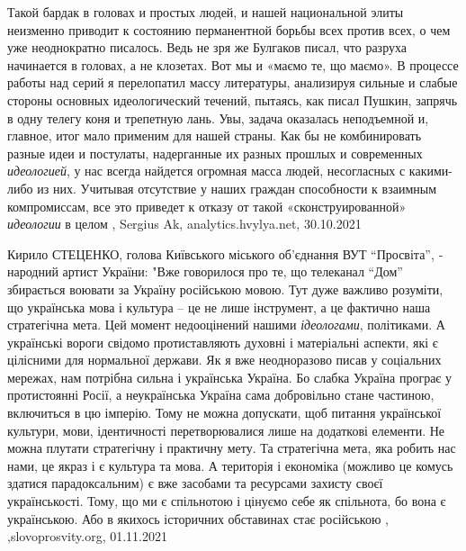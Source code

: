 Такой бардак в головах и простых людей, и нашей национальной элиты неизменно
приводит к состоянию перманентной борьбы всех против всех, о чем уже
неоднократно писалось. Ведь не зря же Булгаков писал, что разруха начинается в
головах, а не клозетах. Вот мы и «маємо те, що маємо».
В процессе работы над серий я перелопатил массу литературы, анализируя сильные
и слабые стороны основных идеологический течений, пытаясь, как писал Пушкин,
запрячь в одну телегу коня и трепетную лань. Увы, задача оказалась неподъемной
и, главное, итог мало применим для нашей страны. Как бы не комбинировать разные
идеи и постулаты, надерганные их разных прошлых и современных \emph{идеологией}, у нас
всегда найдется огромная масса людей, несогласных с какими-либо из них.
Учитывая отсутствие у наших граждан способности к взаимным компромиссам, все
это приведет к отказу от такой «сконструированной» \emph{идеологии} в целом
, Sergius Ak, analytics.hvylya.net, 30.10.2021

Кирило СТЕЦЕНКО, голова Київського міського об’єднання ВУТ \enquote{Просвіта},
­народний артист України: "Вже говорилося про те, що телеканал \enquote{Дом}
збирається воювати за Україну російською мовою. Тут дуже важливо розуміти, що
українська мова і культура – це не лише інструмент, а це фактично наша
стратегічна мета.  Цей момент недооцінений нашими \emph{ідеологами},
політиками.  А українські вороги свідомо протиставляють духовні і матеріальні
аспекти, які є цілісними для нормальної держави. Як я вже неодноразово писав у
соціальних мережах, нам потрібна сильна і українська Україна. Бо слабка Україна
програє у протистоянні Росії, а неукраїнська Україна сама добровільно стане
частиною, включиться в цю імперію. Тому не можна допускати, щоб питання
української культури, мови, ідентичності перетворювалися лише на додаткові
елементи.  Не можна плутати стратегічну і практичну мету. Та стратегічна мета,
яка робить нас нами, це якраз і є культура та мова. А територія і економіка
(можливо це комусь здатися парадоксальним) є вже засобами та ресурсами захисту
своєї українськості. Тому, що ми є спільнотою і цінуємо себе як спільнота, бо
вона є українською. Або в якихось історичних обставинах стає російською
, ,slovoprosvity.org, 01.11.2021
